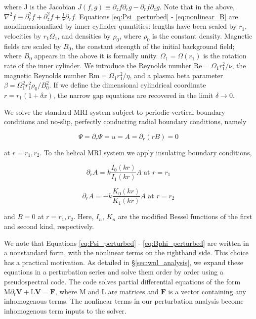\documentclass{emulateapj}
\newcommand{\beq}{\begin{equation}}
\newcommand{\eeq}{\end{equation}}
\newcommand\reye{\mathrm{Re}}
\newcommand\reym{\mathrm{Rm}}
\begin{document}
where J is the Jacobian $J(f, g) \equiv \partial_z f \partial_r g - \partial_r f \partial_z g$. Note that in the above, $\nabla^2 f \equiv \partial_r^2 f + \partial_z^2 f + \frac{1}{r} \partial_r f$. Equations \ref{eq:Psi_perturbed} - \ref{eq:nonlinear_B} are nondimensionalized by inner cylinder quantities: lengths have been scaled by $r_1$, velocities by $r_1 \Omega_1$, and densities by $\rho_0$, where $\rho_0$ is the constant density. Magnetic fields are scaled by $B_0$, the constant strength of the initial background field; where $B_0$ appears in the above it is formally unity. $\Omega_1 = \Omega(r_1)$ is the rotation rate of the inner cylinder. We introduce the Reynolds number $\reye = \Omega_1 r_1^2/\nu$, the magnetic Reynolds number $\reym = \Omega_1 r_1^2 / \eta$, and a plasma beta parameter $\beta = \Omega_1^2 r_1^2 \rho_0/B_0^2$. If we define the dimensional cylindrical coordinate $r = r_1(1 + \delta x)$, the narrow gap equations are recovered in the limit $\delta \rightarrow 0$.

We solve the standard MRI system subject to periodic vertical boundary conditions and no-slip, perfectly conducting radial boundary conditions, namely

\beq
\Psi = \partial_r \Psi = u = A = \partial_r (r B) = 0
\eeq

at $r = r_1, r_2$. To the helical MRI system we apply insulating boundary conditions,

\beq
\partial_r A = k \frac{I_0 (k r)}{I_1 (k r)} A \, \, \mathrm{at} \, \, r = r_1
\eeq

\beq
\partial_r A = - k \frac{K_0 (k r)}{K_1 (k r)} A \, \, \mathrm{at} \, \, r = r_2
\eeq

and $B = 0$ at $r = r_1, r_2$. Here, $I_n$, $K_n$ are the modified Bessel functions of the first and second kind, respectively.

We note that Equations \ref{eq:Psi_perturbed} - \ref{eq:Bphi_perturbed} are written in a nonstandard form, with the nonlinear terms on the righthand side. This choice has a practical motivation. As detailed in \S\ref{sec:wnl_analysis}, we expand these equations in a perturbation series and solve them order by order using a pseudospectral code. The code solves partial differential equations of the form $\mathrm{M} \partial_t \mathbf{V} + \mathrm{L} \mathbf{V} = \mathbf{F}$, where $\mathrm{M}$ and $\mathrm{L}$ are matrices and $\mathbf{F}$ is a vector containing any inhomogenous terms. The nonlinear terms in our perturbation analysis become inhomogenous term inputs to the solver.
\end{document}
